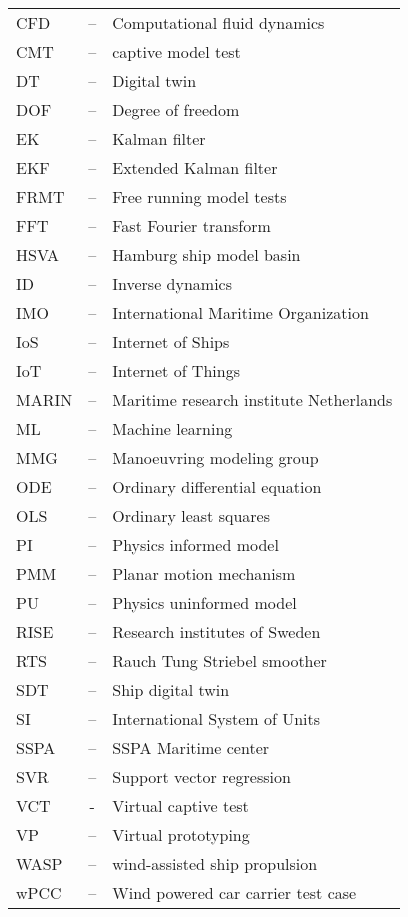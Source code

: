 
\begin{tabular}{ l c l }
CFD & -- & Computational fluid dynamics\\
CMT & -- & captive model test \\
DT  & -- & Digital twin\\
DOF & -- & Degree of freedom\\
EK & -- & Kalman filter \\
EKF & -- & Extended Kalman filter \\
FRMT & -- & Free running model tests \\
FFT & -- & Fast Fourier transform\\
HSVA & -- & Hamburg ship model basin \\
ID & -- & Inverse dynamics \\
IMO & -- & International Maritime Organization \\
IoS & -- & Internet of Ships \\
IoT & -- & Internet of Things \\
MARIN & -- & Maritime research institute Netherlands \\
ML & -- & Machine learning \\
MMG & -- & Manoeuvring modeling group \\
ODE & -- & Ordinary differential equation\\
OLS & -- & Ordinary least squares\\
PI & -- & Physics informed model \\ 
PMM & -- & Planar motion mechanism \\ 
PU & -- & Physics uninformed model \\
RISE & -- & Research institutes of Sweden \\
RTS & -- & Rauch Tung Striebel smoother \\
SDT  & -- & Ship digital twin\\
SI  & -- & International System of Units\\
SSPA & -- & SSPA Maritime center \\
SVR & -- & Support vector regression \\
VCT & - & Virtual captive test \\
VP & -- & Virtual prototyping \\
WASP & -- & wind-assisted ship propulsion \\
wPCC & -- & Wind powered car carrier test case\\
\end{tabular}
